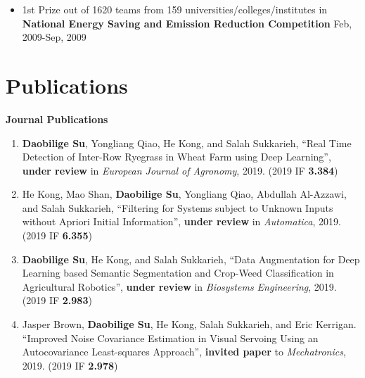 \documentclass[margin,line]{res}
\begin{document}
\begin{resume}
\begin{itemize}
\vspace*{-2.5mm}
\item 1st Prize out of 1620 teams from 159 universities/colleges/institutes in {\bf National Energy Saving and Emission Reduction Competition} Feb, 2009-Sep, 2009


\end{itemize}


\section{\sc Publications}
%
%
\textbf{Journal Publications}

\begin{enumerate}

\item \textbf{Daobilige Su}, Yongliang Qiao, He Kong, and Salah Sukkarieh, ``Real Time Detection of Inter-Row Ryegrass in Wheat Farm using Deep Learning'', \textbf{under review} in \textit{European Journal of Agronomy}, 2019. (2019 IF \textbf{3.384})

\item He Kong, Mao Shan, \textbf{Daobilige Su}, Yongliang Qiao, Abdullah Al-Azzawi, and Salah Sukkarieh, ``Filtering for Systems subject to Unknown Inputs without Apriori Initial Information'', \textbf{under review} in \textit{Automatica}, 2019. (2019 IF  \textbf{6.355})

\item \textbf{Daobilige Su}, He Kong, and Salah Sukkarieh, ``Data Augmentation for Deep Learning based Semantic Segmentation and Crop-Weed Classification in Agricultural Robotics'', \textbf{under review} in \textit{Biosystems Engineering}, 2019. (2019 IF  \textbf{2.983})

\item Jasper Brown, \textbf{Daobilige Su}, He Kong, Salah Sukkarieh, and Eric Kerrigan. ``Improved Noise Covariance Estimation in Visual Servoing Using an Autocovariance Least-squares Approach'', \textbf{invited paper} to \textit{Mechatronics}, 2019. (2019 IF \textbf{2.978})


\end{enumerate}
\end{resume}
\end{document}
